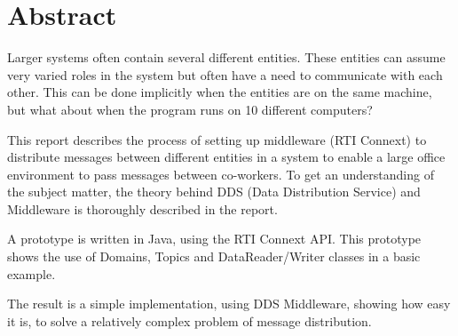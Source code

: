 \chapter*{Abstract}
Larger systems often contain several different entities. These entities can assume very varied roles in the system but often have a need to communicate with each other. This can be done implicitly when the entities are on the same machine, but what about when the program runs on 10 different computers?

This report describes the process of setting up middleware (RTI Connext) to distribute messages between different entities in a system to enable a large office environment to pass messages between co-workers. To get an understanding of the subject matter, the theory behind DDS (Data Distribution Service) and Middleware is thoroughly described in the report. 

A prototype is written in Java, using the RTI Connext API. This prototype shows the use of Domains, Topics and DataReader/Writer classes in a basic example. 

The result is a simple implementation, using DDS Middleware, showing how easy it is, to solve a relatively complex problem of message distribution.

\setcounter{tocdepth}{1}
\tableofcontents